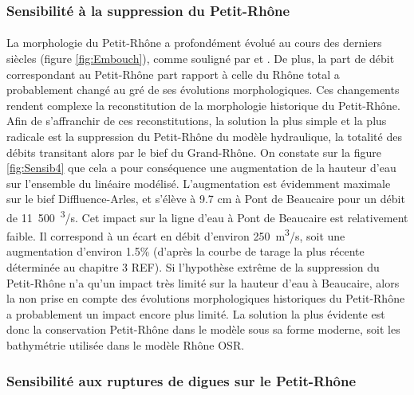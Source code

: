 	\subsubsection{Sensibilité à la suppression du Petit-Rhône} 
	
	\paragraph{} La morphologie du Petit-Rhône a profondément évolué au cours des derniers siècles (figure \ref{fig:Embouch}), comme souligné par \citet{pichard_les_2014} et \citet{raccasi_mutations_2008}. De plus, la part de débit correspondant au Petit-Rhône part rapport à celle du Rhône total a probablement changé au gré de ses évolutions morphologiques. Ces changements rendent complexe la reconstitution de la morphologie historique du Petit-Rhône. Afin de s'affranchir de ces reconstitutions, la solution la plus simple et la plus radicale est la suppression du Petit-Rhône du modèle hydraulique, la totalité des débits transitant alors par le bief du Grand-Rhône. On constate sur la figure \ref{fig:Sensib4} que cela a pour conséquence une augmentation de la hauteur d'eau sur l'ensemble du linéaire modélisé. L'augmentation est évidemment maximale sur le bief Diffluence-Arles, et s'élève à 9.7 cm à Pont de Beaucaire pour un débit de 11~500~\textsuperscript{3}/s. Cet impact sur la ligne d'eau à Pont de Beaucaire est relativement faible. Il correspond à un écart en débit d'environ 250~m\textsuperscript{3}/s, soit une augmentation d'environ 1.5\% (d'après la courbe de tarage la plus récente déterminée au chapitre 3 REF). Si l'hypothèse extrême de la suppression du Petit-Rhône n'a qu'un impact très limité sur la hauteur d'eau à Beaucaire, alors la non prise en compte des évolutions morphologiques historiques du Petit-Rhône a probablement un impact encore plus limité. La solution la plus évidente est donc la conservation Petit-Rhône dans le modèle sous sa forme moderne, soit les bathymétrie utilisée dans le modèle Rhône OSR.
	
	\subsubsection{Sensibilité aux ruptures de digues sur le Petit-Rhône}
	
